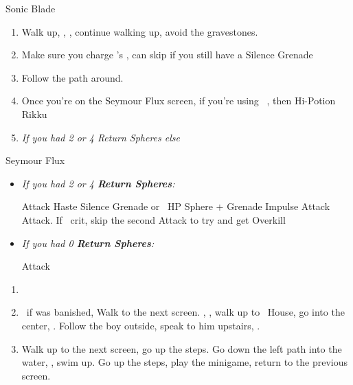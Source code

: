 \begin{multicols}{2}
\begin{equip}
	\begin{itemize}
		\auronf Sonic Blade
	\end{itemize}
\end{equip}
\begin{enumerate}[resume]
	\item Walk up, \sd, \cs[1:20], continue walking up, avoid the gravestones.
	\item Make sure you charge \rikku's \od, can skip if you still have a Silence Grenade
	\item Follow the path around.
	\item Once you're on the Seymour Flux screen, if you're using \rikku\ \od, then Hi-Potion Rikku
	\item \formation{\tidus}{\yuna}{\auron} \textit{If you had 2 or 4 Return Spheres else } \formation{\tidus}{\kimahri}{\wakka}
\end{enumerate}
\begin{battle}[70000]{Seymour Flux}
	\begin{itemize}
		\item \textit{If you had 2 or 4 \textbf{Return Spheres}:}
		      \begin{itemize}
			      \yunaf Attack
			      \tidusf Haste \yuna
			      \switch{\auron}{\rikku}
			      \rikkuf Silence Grenade or \od\ HP Sphere + Grenade
			      \summon{\bahamut}
			      \bahamutf Impulse
			      \yunaf Attack
			      \tidusf Attack. If \yuna\ crit, skip the second Attack to try and get Overkill
		      \end{itemize}
		\item \textit{If you had 0 \textbf{Return Spheres}:}
		      \begin{itemize}
			      \switch{\tidus}{\yuna}
			      \summon{\bahamut}
			      \bahamutf Attack
		      \end{itemize}
	\end{itemize}
\end{battle}
\begin{enumerate}[resume]
	\item \formation{\tidus}{\kimahri}{\auron}
	\item \save\ if \bahamut was banished, Walk to the next screen. \skippablefmv[0:20], \sd, walk up to \tidus\ House, go into the center, \sd. Follow the boy outside, speak to him upstairs, \sd.
	\item Walk up to the next screen, go up the steps. Go down the left path into the water, \sd, swim up. Go up the steps, play the minigame, return to the previous screen.

\end{enumerate}
\end{multicols}
